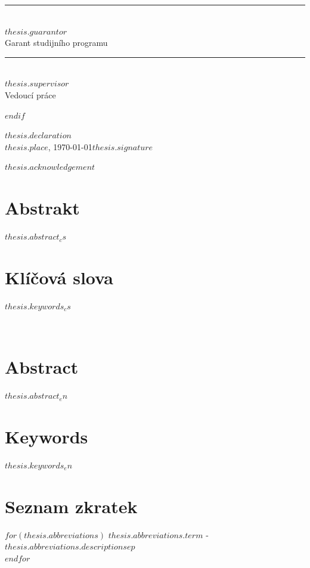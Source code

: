 \documentclass[
$for(babel-otherlangs)$
  $babel-otherlangs$,
$endfor$
$if(babel-lang)$
  $babel-lang$,
$endif$
$if(fontsize)$
  $fontsize$,
$endif$
$if(papersize)$
  $papersize$paper,
$endif$
$for(classoption)$
  $classoption$$sep$,
$endfor$
]{$documentclass$}
\newif\ifthesisenglish
\newcommand{\thesislabel}[2]{\ifthesisenglish#2\else#1\fi}
\newcommand{\thesisabstractlabel}{\thesislabel{Abstrakt}{Abstract}}
\newcommand{\thesiskeywordslabel}{\thesislabel{Klíčová slova}{Keywords}}
\newcommand{\thesisotherabstractlabel}{\thesislabel{Abstract}{Abstrakt}}
\newcommand{\thesisotherkeywordslabel}{\thesislabel{Keywords}{Klíčová slova}}
\newcommand{\thesisabbreviationslabel}{\thesislabel{Seznam zkratek}{List of abbreviations}}
\begin{document}
{\noindent\begin{minipage}{0.48\textwidth}\centering
\rule{5.5cm}{0.4pt}\\[1mm]
$thesis.guarantor$\\
Garant studijního programu
\end{minipage}\hfill
\begin{minipage}{0.48\textwidth}\centering
\rule{5.5cm}{0.4pt}\\[1mm]
$thesis.supervisor$\\
Vedoucí práce
\end{minipage}

\newpage
}
$endif$

\pagestyle{empty}
\null\vfill
\noindent $thesis.declaration$
\\[2cm]
$thesis.place$, \mydate\today \hfill $thesis.signature$
\newpage

\null\vfill
\noindent $thesis.acknowledgement$
\newpage

\section*{\thesisabstractlabel}
\ifthesisenglish
$thesis.abstract_en$
\else
$thesis.abstract_cs$
\fi

\section*{\thesiskeywordslabel}
\ifthesisenglish
$thesis.keywords_en$
\else
$thesis.keywords_cs$
\fi
\\

\section*{\thesisotherabstractlabel}
\ifthesisenglish
$thesis.abstract_cs$
\else
$thesis.abstract_en$
\fi

\section*{\thesisotherkeywordslabel}
\ifthesisenglish
$thesis.keywords_cs$
\else
$thesis.keywords_en$
\fi

\newpage

\tableofcontents
\newpage

\section*{\thesisabbreviationslabel}
$for(thesis.abbreviations)$
$thesis.abbreviations.term$ - $thesis.abbreviations.description$$sep$\\
$endfor$
\end{document}
